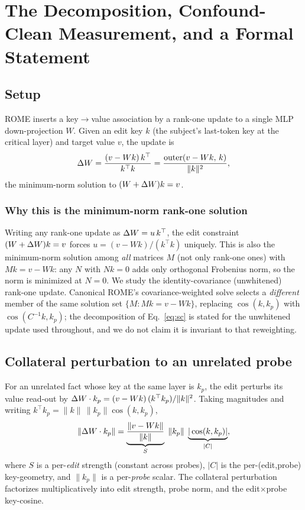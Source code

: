 \section{The \texorpdfstring{\SxC}{SxC} Decomposition, Confound-Clean Measurement, and a Formal Statement}
\label{sec:method}

\subsection{Setup}
ROME inserts a key$\rightarrow$value association by a rank-one
update to a single MLP down-projection $W$. Given an edit key $k$ (the
subject's last-token key at the critical layer) and target value $v$, the
update is
\begin{equation}
\Delta W = \frac{(v-Wk)\,k^{\top}}{k^{\top}k}
    = \frac{\mathrm{outer}(v-Wk,\,k)}{\|k\|^2},
\label{eq:rome}
\end{equation}
the minimum-norm solution to $(W+\Delta W)k=v$.

\subsubsection{Why this is the minimum-norm rank-one solution}
Writing any rank-one update as $\Delta W = u\,k^{\top}$, the edit constraint
$(W+\Delta W)k = v$ forces $u = (v-Wk)/(k^{\top}k)$ uniquely. This is also the
minimum-norm solution among \emph{all} matrices $M$ (not only rank-one ones)
with $Mk = v-Wk$: any $N$ with $Nk=0$ adds only orthogonal Frobenius norm, so
the norm is minimized at $N=0$.
We study the identity-covariance (unwhitened) rank-one update. Canonical
ROME's covariance-weighted solve selects a \emph{different} member of the same
solution set $\{M : Mk = v-Wk\}$, replacing $\cos(k,k_p)$ with
$\cos(C^{-1}k,k_p)$; the decomposition of Eq.~\ref{eq:sc} is stated for the
unwhitened update used throughout, and we do not claim it is invariant to
that reweighting.

\subsection{Collateral perturbation to an unrelated probe}
For an unrelated
fact whose key at the same layer is $k_p$, the edit perturbs its value
read-out by $\Delta W\cdot k_p = (v-Wk)\,(k^{\top}k_p)/\|k\|^2$. Taking magnitudes
and writing $k^{\top}k_p = \|k\|\,\|k_p\|\cos(k,k_p)$,
\begin{equation}
\|\Delta W\cdot k_p\| = \underbrace{\frac{\|v-Wk\|}{\|k\|}}_{S}\;\|k_p\|\;
                   \underbrace{|\cos(k,k_p)|}_{|C|},
\label{eq:sc}
\end{equation}
where $S$ is a per-\emph{edit} strength (constant across probes), $|C|$ is the
per-(edit,probe) key-geometry, and $\|k_p\|$ is a per-\emph{probe} scalar. The
collateral perturbation factorizes multiplicatively into edit strength, probe
norm, and the edit$\times$probe key-cosine.

